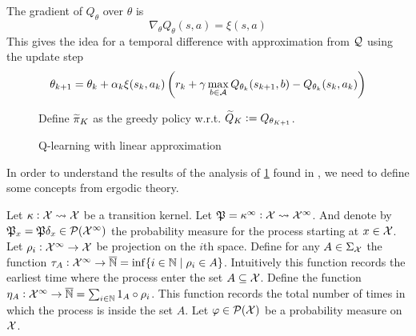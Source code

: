 The gradient of $Q_\theta$ over $\theta$ is
\[ \nabla_\theta Q_\theta(s, a) = \xi(s, a) \]
This gives the idea for a temporal difference with approximation from
$\mathcal{Q}$ using the update step
\[ \theta_{k+1} = \theta_k + \alpha_k \xi(s_k, a_k)
  \left( r_k + \gamma \max_{b \in \mathcal{A}} Q_{\theta_k}(s_{k+1}, b)
- Q_{\theta_k}(s_k, a_k) \right) \]

\begin{figure}[H]
\begin{algorithm}[H] %
  \caption{Q-learning with linear approximation}

  Define $\widetilde{\pi}_K$ as the greedy policy w.r.t.
  $\widetilde{Q}_K \vcentcolon= Q_{\theta_{K+1}}$.

  \label{alg:QLlinear}
\end{algorithm}
\end{figure}

In order to understand the results of the analysis of \cref{alg:QLlinear}
found in ,
we need to define some concepts from ergodic theory.

Let $\kappa : \mathcal{X} \leadsto \mathcal{X}$ be a transition kernel.
Let $\mathfrak{P} = \kappa^\infty : \mathcal{X} \leadsto \mathcal{X}^\infty$.
And denote by
$\mathfrak{P}_x = \mathfrak{P}\delta_x \in \mathcal{P}(\mathcal{X}^\infty)$
the probability measure for the process starting at $x \in \mathcal{X}$.
Let $\rho_i : \mathcal{X}^\infty \to \mathcal{X}$ be projection on the
$i$th space.
Define for any $A \in \Sigma_{\mathcal{X}}$ the function
$\tau_A : \mathcal{X}^\infty \to \overline{\mathbb{N}} = \inf\{ i \in \mathbb{N} \mid \rho_i \in A \}$.
Intuitively this function records the earliest time where the process
enter the set $A \subseteq \mathcal{X}$.
Define the function
$\eta_A : \mathcal{X}^\infty \to \overline{\mathbb{N}} = \sum_{i \in \mathbb{N}} 1_A \circ \rho_i$.
This function records the total number of times in which the process is
inside the set $A$.
Let $\varphi \in \mathcal{P}(\mathcal{X})$ be a probability measure on $\mathcal{X}$.

